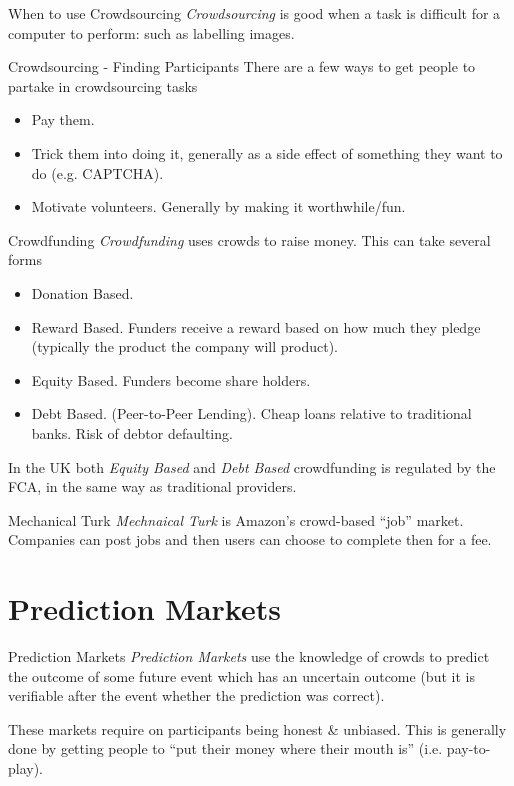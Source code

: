 \documentclass[11pt,a4paper]{article}
\begin{document}
  \begin{proposition}{When to use Crowdsourcing}
    \textit{Crowdsourcing} is good when a task is difficult for a computer to perform: such as labelling images.
  \end{proposition}

  \begin{proposition}{Crowdsourcing - Finding Participants}
    There are a few ways to get people to partake in crowdsourcing tasks
    \begin{itemize}
      \item Pay them.
      \item Trick them into doing it, generally as a side effect of something they want to do (e.g. CAPTCHA).
      \item Motivate volunteers. Generally by making it worthwhile/fun.
    \end{itemize}
  \end{proposition}

  \begin{definition}{Crowdfunding}
    \textit{Crowdfunding} uses crowds to raise money. This can take several forms
    \begin{itemize}
      \item Donation Based.
      \item Reward Based. Funders receive a reward based on how much they pledge (typically the product the company will product).
      \item Equity Based. Funders become share holders.
      \item Debt Based. (Peer-to-Peer Lending). Cheap loans relative to traditional banks. Risk of debtor defaulting.
    \end{itemize}
    In the UK both \textit{Equity Based} and \textit{Debt Based} crowdfunding is regulated by the FCA, in the same way as traditional providers.
  \end{definition}

  \begin{definition}{Mechanical Turk}
    \textit{Mechnaical Turk} is Amazon's crowd-based ``job'' market. Companies can post jobs and then users can choose to complete then for a fee.
  \end{definition}

\section{Prediction Markets}

  \begin{definition}{Prediction Markets}
    \textit{Prediction Markets} use the knowledge of crowds to predict the outcome of some future event which has an uncertain outcome (but it is verifiable after the event whether the prediction was correct).
    \par These markets require on participants being honest \& unbiased. This is generally done by getting people to ``put their money where their mouth is'' (i.e. pay-to-play).
  \end{definition}
\end{document}
